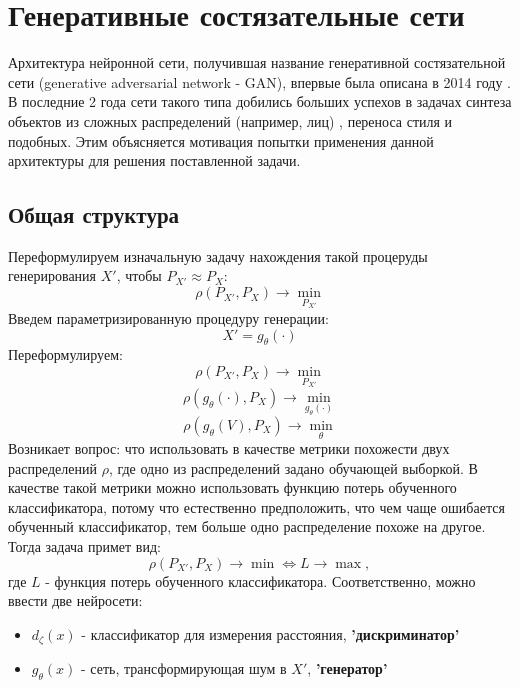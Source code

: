 \section{Генеративные состязательные сети}
	Архитектура нейронной сети, получившая название генеративной состязательной сети (generative adversarial network - GAN), впервые была описана в 2014 году \cite{GAN-original}. В последние 2 года сети такого типа добились больших успехов в задачах синтеза объектов из сложных распределений (например, лиц) \cite{cGAN-face}, переноса стиля \cite{algorithm-of-articsic-style} и подобных. Этим объясняется мотивация попытки применения данной архитектуры для решения поставленной задачи.
	\subsection{Общая структура}
		Переформулируем изначальную задачу нахождения такой процеруды генерирования $X'$, чтобы $ P_{X'} \approx P_X$:
		$$ \rho(P_{X'}, P_X) \longrightarrow \underset{P_{X'}}{\min} $$
		Введем параметризированную процедуру генерации:
		$$ X' = g_{\theta}(\cdot) $$
		Переформулируем:
		$$ \rho(P_{X'}, P_X) \longrightarrow \underset{P_{X'}}{\min} $$
		$$ \rho(g_{\theta}(\cdot), P_X) \longrightarrow \underset{g_{\theta}(\cdot)}{\min} $$
		$$ \rho(g_{\theta}(V), P_X) \longrightarrow \underset{\theta}{\min} $$
		Возникает вопрос: что использовать в качестве метрики похожести двух распределений $\rho$, где одно из распределений задано обучающей выборкой.
		В качестве такой метрики можно использовать функцию потерь обученного классификатора, потому что естественно предположить, что чем чаще ошибается обученный классификатор, тем больше одно распределение похоже на другое. Тогда задача примет вид:
		$$ \rho(P_{X'}, P_X) \longrightarrow \min \Leftrightarrow L \longrightarrow \max, $$
		где $L$ - функция потерь обученного классификатора.
		Соответственно, можно ввести две нейросети:
		\begin{itemize}
			\item $d_{\zeta}(x)$ - классификатор для измерения расстояния, \textbf{'дискриминатор'}
			\item $g_{\theta}(x)$ - сеть, трансформирующая шум в $X'$, \textbf{'генератор'}
		\end{itemize}
		
